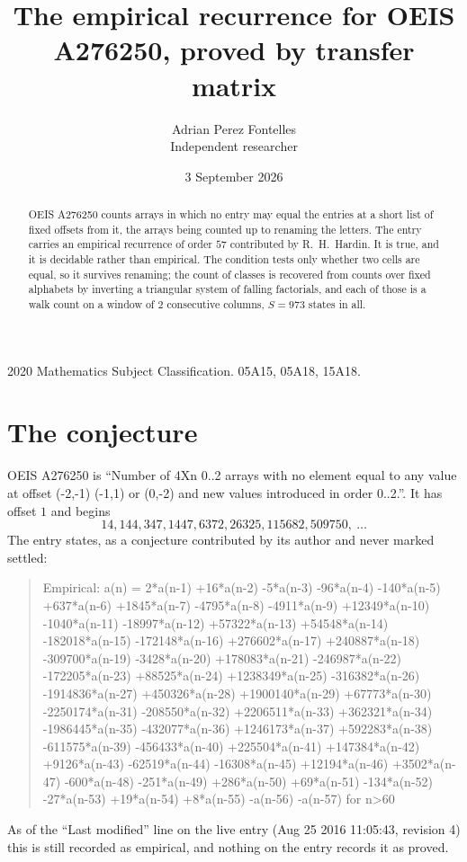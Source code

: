 \documentclass[11pt,a4paper]{article}
\title{The empirical recurrence for OEIS A276250, proved by transfer matrix}
\author{Adrian Perez Fontelles\\ \small Independent researcher}
\date{3 September 2026}
\theoremstyle{plain}
\theoremstyle{definition}
\begin{document}
\maketitle

\begin{abstract}
OEIS A276250 counts arrays in which no entry may equal the entries at a short list of fixed offsets
from it, the arrays being counted up to renaming the letters. The entry carries an empirical
recurrence of order $57$ contributed by R.~H.~Hardin. It is true, and it is decidable
rather than empirical. The condition tests only whether two cells are equal, so it survives
renaming; the count of classes is recovered from counts over fixed alphabets by inverting a
triangular system of falling factorials, and each of those is a walk count on a window of
$2$ consecutive columns, $S=973$ states in all.
\end{abstract}

\noindent\small 2020 Mathematics Subject Classification. 05A15, 05A18, 15A18.\normalsize

\section{The conjecture}

OEIS A276250 is ``Number of 4Xn 0..2 arrays with no element equal to any value at offset (-2,-1) (-1,1) or (0,-2) and new values introduced in order 0..2.''. It has offset $1$ and begins
\[
14, 144, 347, 1447, 6372, 26325, 115682, 509750,\ \dots
\]
The entry states, as a conjecture contributed by its author and never marked settled:
\begin{quote}
Empirical: a(n) = 2*a(n-1) +16*a(n-2) -5*a(n-3) -96*a(n-4) -140*a(n-5) +637*a(n-6) +1845*a(n-7) -4795*a(n-8) -4911*a(n-9) +12349*a(n-10) -1040*a(n-11) -18997*a(n-12) +57322*a(n-13) +54548*a(n-14) -182018*a(n-15) -172148*a(n-16) +276602*a(n-17) +240887*a(n-18) -309700*a(n-19) -3428*a(n-20) +178083*a(n-21) -246987*a(n-22) -172205*a(n-23) +88525*a(n-24) +1238349*a(n-25) -316382*a(n-26) -1914836*a(n-27) +450326*a(n-28) +1900140*a(n-29) +67773*a(n-30) -2250174*a(n-31) -208550*a(n-32) +2206511*a(n-33) +362321*a(n-34) -1986445*a(n-35) -432077*a(n-36) +1246173*a(n-37) +592283*a(n-38) -611575*a(n-39) -456433*a(n-40) +225504*a(n-41) +147384*a(n-42) +9126*a(n-43) -62519*a(n-44) -16308*a(n-45) +12194*a(n-46) +3502*a(n-47) -600*a(n-48) -251*a(n-49) +286*a(n-50) +69*a(n-51) -134*a(n-52) -27*a(n-53) +19*a(n-54) +8*a(n-55) -a(n-56) -a(n-57) for n>60
\end{quote}
As of the ``Last modified'' line on the live entry (Aug 25 2016 11:05:43, revision 4) this is still
recorded as empirical, and nothing on the entry records it as proved.
\end{document}
